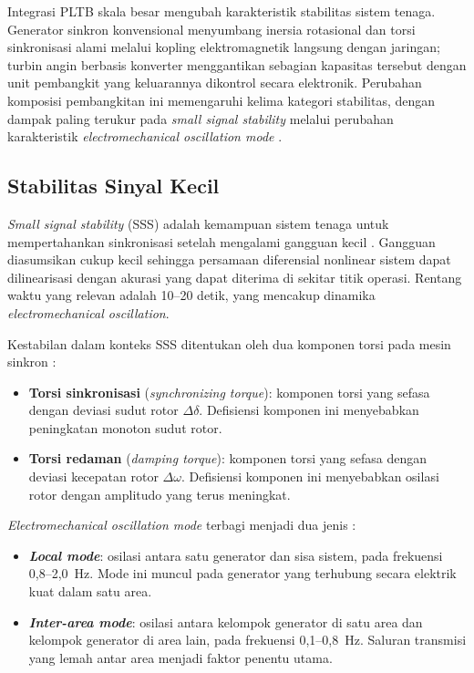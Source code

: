 Integrasi PLTB skala besar mengubah karakteristik stabilitas sistem tenaga. Generator
sinkron konvensional menyumbang inersia rotasional dan torsi sinkronisasi alami melalui
kopling elektromagnetik langsung dengan jaringan; turbin angin berbasis konverter
menggantikan sebagian kapasitas tersebut dengan unit pembangkit yang keluarannya
dikontrol secara elektronik. Perubahan komposisi pembangkitan ini memengaruhi kelima
kategori stabilitas, dengan dampak paling terukur pada \textit{small signal stability}
melalui perubahan karakteristik \textit{electromechanical oscillation mode}
\cite{kundur1994power}.

\subsection{Stabilitas Sinyal Kecil}

\textit{Small signal stability} (SSS) adalah kemampuan sistem tenaga untuk mempertahankan
sinkronisasi setelah mengalami gangguan kecil \cite{kundur1994power}. Gangguan diasumsikan
cukup kecil sehingga persamaan diferensial nonlinear sistem dapat dilinearisasi dengan
akurasi yang dapat diterima di sekitar titik operasi. Rentang waktu yang relevan adalah
10--20 detik, yang mencakup dinamika \textit{electromechanical oscillation}.

Kestabilan dalam konteks SSS ditentukan oleh dua komponen torsi pada mesin sinkron
\cite{kundur1994power}:
\begin{itemize}
  \item \textbf{Torsi sinkronisasi} (\textit{synchronizing torque}): komponen torsi yang
    sefasa dengan deviasi sudut rotor $\Delta\delta$. Defisiensi komponen ini menyebabkan
    peningkatan monoton sudut rotor.
  \item \textbf{Torsi redaman} (\textit{damping torque}): komponen torsi yang sefasa
    dengan deviasi kecepatan rotor $\Delta\omega$. Defisiensi komponen ini menyebabkan
    osilasi rotor dengan amplitudo yang terus meningkat.
\end{itemize}

\textit{Electromechanical oscillation mode} terbagi menjadi dua jenis \cite{kundur1994power}:
\begin{itemize}
  \item \textbf{\textit{Local mode}}: osilasi antara satu generator dan sisa sistem,
    pada frekuensi 0{,}8--2{,}0~Hz. Mode ini muncul pada generator yang terhubung
    secara elektrik kuat dalam satu area.
  \item \textbf{\textit{Inter-area mode}}: osilasi antara kelompok generator di satu
    area dan kelompok generator di area lain, pada frekuensi 0{,}1--0{,}8~Hz.
    Saluran transmisi yang lemah antar area menjadi faktor penentu utama.
\end{itemize}

